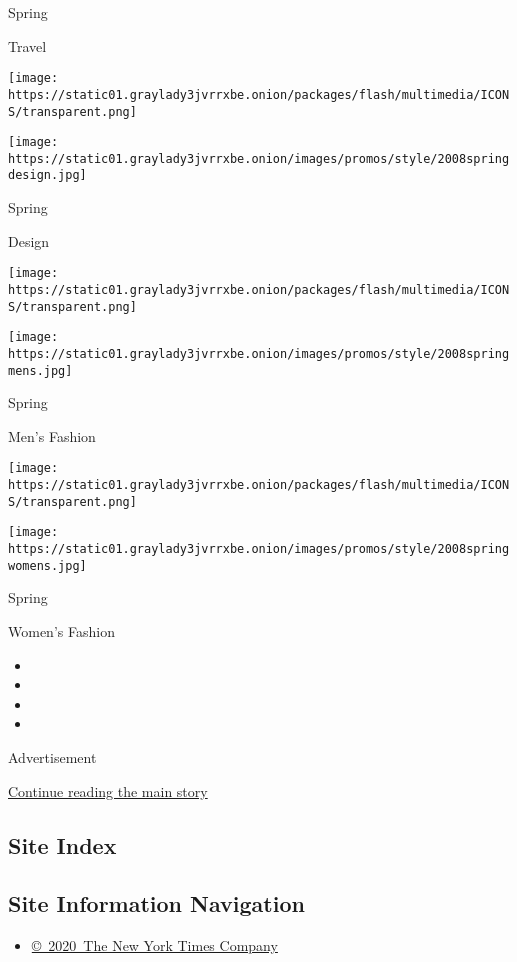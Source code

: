 Spring

Travel

\texttt{[image: https://static01.graylady3jvrrxbe.onion/packages/flash/multimedia/ICONS/transparent.png]}

\texttt{[image: https://static01.graylady3jvrrxbe.onion/images/promos/style/2008springdesign.jpg]}

Spring

Design

\texttt{[image: https://static01.graylady3jvrrxbe.onion/packages/flash/multimedia/ICONS/transparent.png]}

\texttt{[image: https://static01.graylady3jvrrxbe.onion/images/promos/style/2008springmens.jpg]}

Spring

Men's Fashion

\texttt{[image: https://static01.graylady3jvrrxbe.onion/packages/flash/multimedia/ICONS/transparent.png]}

\texttt{[image: https://static01.graylady3jvrrxbe.onion/images/promos/style/2008springwomens.jpg]}

Spring

Women's Fashion

\begin{itemize}
\item
\item
\item
\item
\end{itemize}

Advertisement

\protect\hyperlink{after-bottom}{Continue reading the main story}

\hypertarget{site-index}{%
\subsection{Site Index}\label{site-index}}

\hypertarget{site-information-navigation}{%
\subsection{Site Information
Navigation}\label{site-information-navigation}}

\begin{itemize}
\tightlist
\item
  \href{https://help.nytimes3xbfgragh.onion/hc/en-us/articles/115014792127-Copyright-notice}{©~2020~The
  New York Times Company}
\end{itemize}


